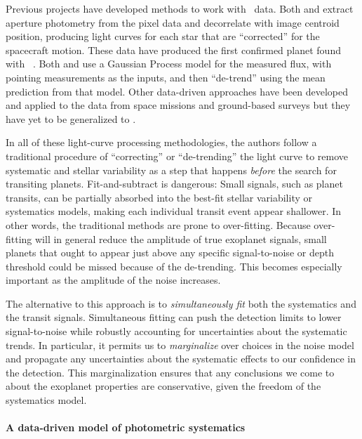 \documentclass[12pt,preprint]{aastex}
\begin{document}
Previous projects have developed methods to work with \KT\ data.
Both \citet{Vanderburg:2014} and \citet{Armstrong:2014}
extract aperture photometry from the pixel data
and decorrelate with image centroid position, producing light curves for each
star that are ``corrected'' for the spacecraft motion.
These data have produced the first confirmed planet found with
\KT\ \citep{Vanderburg:2015}.
Both \citet{Aigrain:2015} and \citet{Crossfield:2015} use a Gaussian Process
model for the measured flux, with pointing measurements as the inputs, and
then ``de-trend'' using the mean prediction from that model.
Other data-driven approaches have been developed and applied to the data from
space missions \citep[for example,][]{Ofir:2010, Stumpe:2012, Smith:2012,
Petigura:2013, Wang:2015} and ground-based surveys \citep[for
example,][]{Kovacs:2005, Tamuz:2005, Berta:2012} but they have yet to be
generalized to \KT.

In all of these light-curve processing methodologies, the authors follow a
traditional procedure of ``correcting'' or ``de-trending'' the light curve to
remove systematic and stellar variability as a step that happens \emph{before}
the search for transiting planets.
Fit-and-subtract is dangerous:
Small signals, such as planet transits, can be
partially absorbed into the best-fit stellar variability or systematics
models, making each individual transit event appear shallower.
In other words, the traditional methods are prone to over-fitting.
Because over-fitting will in general reduce the amplitude of true exoplanet
signals, small planets that ought to appear just above any specific
signal-to-noise or depth threshold could be missed because of the de-trending.
This becomes especially important as the amplitude of the noise increases.

The alternative to this approach is to \emph{simultaneously fit} both the
systematics and the transit signals.
Simultaneous fitting can push the detection limits to lower signal-to-noise
while robustly accounting for uncertainties about the systematic trends.
In particular, it permits us to \emph{marginalize} over choices in the noise
model and propagate any uncertainties about the systematic effects
to our confidence in the detection.
This marginalization ensures that any conclusions we come to about the
exoplanet properties are conservative, given the freedom of the systematics
model.

\paragraph{A data-driven model of photometric systematics}
\end{document}
